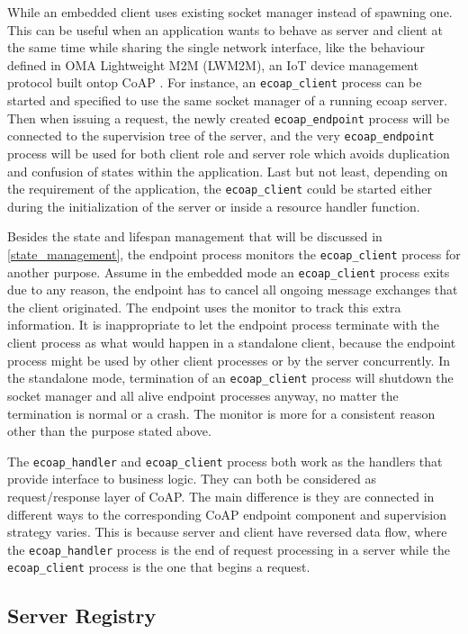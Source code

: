 While an embedded client uses existing socket manager instead of spawning one. This can be useful when an application wants to behave as server and client at the same time while sharing the single network interface, like the behaviour defined in OMA Lightweight M2M (LWM2M), an IoT device management protocol built ontop CoAP \cite{lwm2m}. For instance, an \verb|ecoap_client| process can be started and specified to use the same socket manager of a running ecoap server. Then when issuing a request, the newly created \verb|ecoap_endpoint| process will be connected to the supervision tree of the server, and the very \verb|ecoap_endpoint| process will be used for both client role and server role which avoids duplication and confusion of states within the application. Last but not least, depending on the requirement of the application, the \verb|ecoap_client| could be started either during the initialization of the server or inside a resource handler function.

Besides the state and lifespan management that will be discussed in \ref{state_management}, the endpoint process monitors the \verb|ecoap_client| process for another purpose. Assume in the embedded mode an \verb|ecoap_client| process exits due to any reason, the endpoint has to cancel all ongoing message exchanges that the client originated. The endpoint uses the monitor to track this extra information. It is inappropriate to let the endpoint process terminate with the client process as what would happen in a standalone client, because the endpoint process might be used by other client processes or by the server concurrently. In the standalone mode, termination of an \verb|ecoap_client| process will shutdown the socket manager and all alive endpoint processes anyway, no matter the termination is normal or a crash. The monitor is more for a consistent reason other than the purpose stated above.

The \verb|ecoap_handler| and \verb|ecoap_client| process both work as the handlers that provide interface to business logic. They can both be considered as request/response layer of CoAP. The main difference is they are connected in different ways to the corresponding CoAP endpoint component and supervision strategy varies. This is because server and client have reversed data flow, where the \verb|ecoap_handler| process is the end of request processing in a server while the \verb|ecoap_client| process is the one that begins a request.

\subsection{Server Registry}\label{coap_registry}

